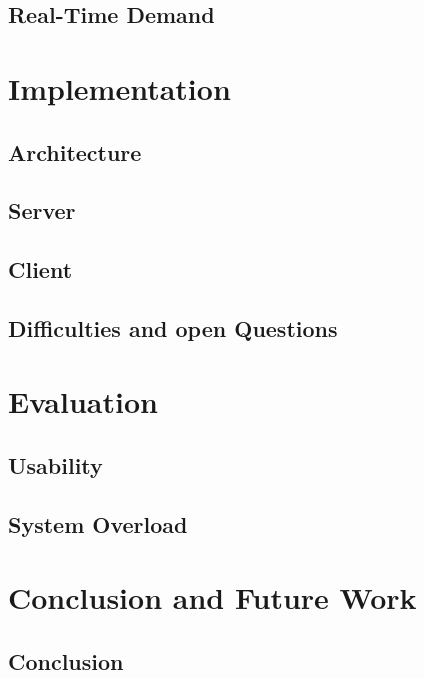 \documentclass[english, BCOR=6mm, twoside=true, open=right]{tudscrreprt}
\begin{document}
\section{Real-Time Demand}


% 


\chapter{Implementation}
\section{Architecture}
\section{Server}
\section{Client}
\section{Difficulties and open Questions}


\chapter{Evaluation}
\section{Usability}
\section{System Overload}


\chapter{Conclusion and Future Work}
\section{Conclusion}
\end{document}
